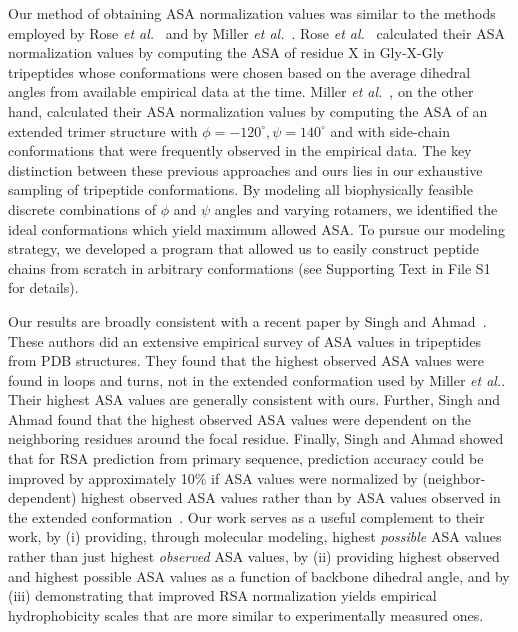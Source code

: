 \documentclass[11pt]{article}
\begin{document}
Our method of obtaining ASA normalization values was similar to the methods employed by Rose \emph{et al.}~\cite{Rose1985} and by Miller \emph{et al.}~\cite{Miller1987}. Rose \emph{et al.}~\cite{Rose1985} calculated their ASA normalization values by computing the ASA of residue X in Gly-X-Gly tripeptides whose conformations were chosen based on the average dihedral angles from available empirical data at the time. Miller \emph{et al.}~\cite{Miller1987}, on the other hand, calculated their ASA normalization values by computing the ASA of an extended trimer structure with $\phi = -120^\circ, \psi= 140^\circ$ and with side-chain conformations that were frequently observed in the empirical data. The key distinction between these previous approaches and ours lies in our exhaustive sampling of tripeptide conformations. By modeling all biophysically feasible discrete combinations of $\phi$ and $\psi$ angles and varying rotamers, we identified the ideal conformations which yield maximum allowed ASA. To pursue our modeling strategy, we developed a program that allowed us to easily construct peptide chains from scratch in arbitrary conformations (see Supporting Text in File S1 for details).

Our results are broadly consistent with a recent paper by Singh and Ahmad~\cite{SinghAhmad2009}. These authors did an extensive empirical survey of ASA values in tripeptides from PDB structures. They found that the highest observed ASA values were found in loops and turns, not in the extended conformation used by Miller \emph{et al.}. Their highest ASA values are generally consistent with ours. Further, Singh and Ahmad found that the highest observed ASA values were dependent on the neighboring residues around the focal residue. Finally, Singh and Ahmad showed that for RSA prediction from primary sequence, prediction accuracy could be improved by approximately 10\% if ASA values were normalized by (neighbor-dependent) highest observed ASA values rather than by ASA values observed in the extended conformation~\cite{SinghAhmad2009}. Our work serves as a useful complement to their work, by (i) providing, through molecular modeling, highest \emph{possible} ASA values rather than just highest \emph{observed} ASA values, by (ii) providing highest observed and highest possible ASA values as a function of backbone dihedral angle, and by (iii) demonstrating that improved RSA normalization yields empirical hydrophobicity scales that are more similar to experimentally measured ones.
\end{document}
